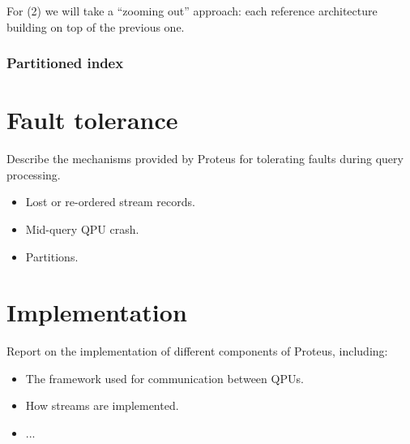 For (2) we will take a ``zooming out'' approach: each reference architecture
building on top of the previous one.

\subsubsection{Partitioned index}

\section{Fault tolerance}
Describe the mechanisms provided by Proteus for tolerating faults during query
processing.
\begin{itemize}
  \item Lost or re-ordered stream records.
  \item Mid-query QPU crash.
  \item Partitions.
\end{itemize}

\section{Implementation}
Report on the implementation of different components of Proteus, including:
\begin{itemize}
  \item The framework used for communication between QPUs.
  \item How streams are implemented.
  \item ...
\end{itemize}
